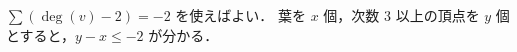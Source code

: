 \subsection{}
$\sum (\deg(v) - 2) = -2$ を使えばよい．
葉を $x$ 個，次数 $3$ 以上の頂点を $y$ 個とすると，$y - x \leq -2$ が分かる．